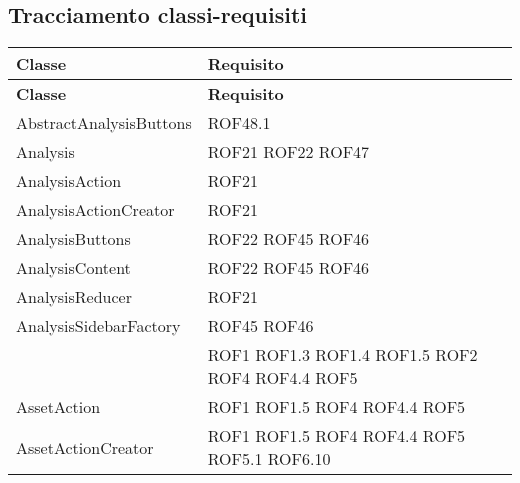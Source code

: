 	\subsection{Tracciamento classi-requisiti}
	\def\arraystretch{1.5}
	\begin{longtable}{p{5cm}!{\VRule[1pt]}p{2.5cm}}
		\color{white} \textbf{Classe} & \color{white} \textbf{Requisito} \\ 
		\endfirsthead
		\color{white} \textbf{Classe} & \color{white} \textbf{Requisito} \\ 
		\endhead
		AbstractAnalysisButtons & ROF48.1\\
		Analysis & ROF21 \newline ROF22 \newline ROF47\\
		AnalysisAction & ROF21\\
		AnalysisActionCreator & ROF21\\
		AnalysisButtons & ROF22 \newline ROF45 \newline ROF46\\
		AnalysisContent & ROF22 \newline ROF45 \newline ROF46\\
		AnalysisReducer & ROF21\\
		AnalysisSidebarFactory & ROF45 \newline ROF46\\
		 & ROF1 \newline ROF1.3 \newline ROF1.4 \newline ROF1.5 \newline ROF2 \newline ROF4 \newline ROF4.4 \newline ROF5\\
		AssetAction & ROF1 \newline ROF1.5 \newline ROF4 \newline ROF4.4 \newline ROF5\\
		AssetActionCreator & ROF1 \newline ROF1.5 \newline ROF4 \newline ROF4.4 \newline ROF5 \newline ROF5.1 \newline ROF6.10\\

\end{longtable}
